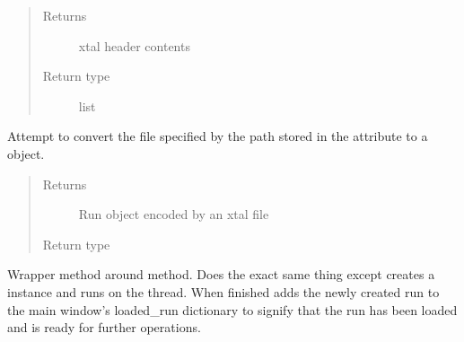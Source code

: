 \documentclass[letterpaper,10pt,english]{sphinxmanual}
\begin{document}
\begin{fulllineitems}
\begin{fulllineitems}
\begin{quote}
\begin{description}
\item[{Returns}] \leavevmode
xtal header contents

\item[{Return type}] \leavevmode
list

\end{description}\end{quote}

\end{fulllineitems}


\begin{fulllineitems}
\label{\detokenize{polo.utils:polo.utils.io_utils.RunDeserializer.xtal_to_run}}
Attempt to convert the file specified by the path stored in the
attribute to a  object.
\begin{quote}\begin{description}
\item[{Returns}] \leavevmode
Run object encoded by an xtal file

\item[{Return type}] \leavevmode
{\hyperref[\detokenize{polo.crystallography:polo.crystallography.run.Run}]{}}

\end{description}\end{quote}

\end{fulllineitems}


\begin{fulllineitems}
\label{\detokenize{polo.utils:polo.utils.io_utils.RunDeserializer.xtal_to_run_on_thread}}
Wrapper method around  method. Does the exact same thing
except creates a  instance and runs  on the
thread. When finished adds the newly created run to the main window’s
loaded\_run dictionary to signify that the run has been loaded and is
ready for further operations.

\end{fulllineitems}


\end{fulllineitems}
\end{document}
